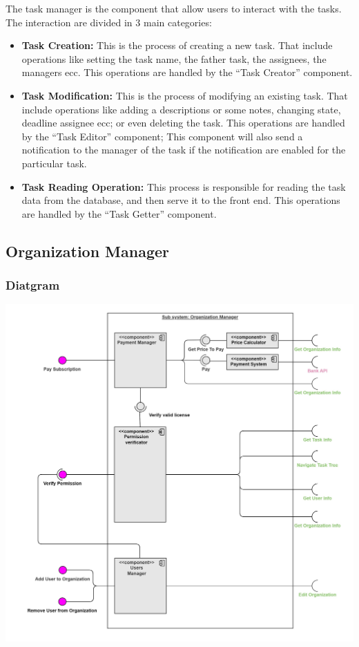 \documentclass{article}
\begin{document}
The task manager is the component that allow users to interact with the tasks.
The interaction are divided in 3 main categories:
\begin{itemize}
    \item \textbf{Task Creation: }
    This is the process of creating a new task. That include operations like 
    setting the task name, the father task, the assignees, the managers ecc.
    This operations are handled by the ``Task Creator'' component.
    \item \textbf{Task Modification: }
    This is the process of modifying an existing task. That include operations like adding a descriptions or some notes,
    changing state, deadline assignee ecc; or even deleting the task.
    This operations are handled by the ``Task Editor'' component; This component will also send a notification to the manager of the task
    if the notification are enabled for the particular task.
    \item \textbf{Task Reading Operation: }
    This process is responsible for reading the task data from the database, and then serve it to the front end.
    This operations are handled by the ``Task Getter'' component.
\end{itemize}


\subsection{Organization Manager}
\subsubsection{Diatgram}
\includegraphics[width=\textwidth,height=\textheight,keepaspectratio]{images/component_diagram/organization_manager.jpg}
\end{document}
